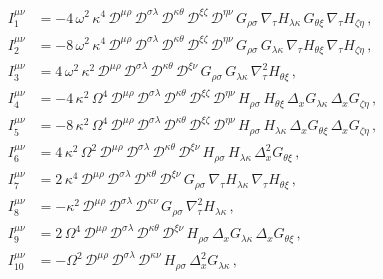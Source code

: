 \documentclass[11pt]{article}
\newcommand{\CD}{\mathcal{D}}
\begin{document}
\begin{subequations}
\begin{align}
	I_1^{\mu\nu} & = - 4 \, \omega^2 \, \kappa^4 \, \CD^{\mu\rho} \, \CD^{\sigma\lambda} \, \CD^{\kappa\theta} \, \CD^{\xi\zeta}  \, \CD^{\eta\nu} \, G_{\rho\sigma} \, \nabla_{\!\tau} H_{\lambda\kappa} \, G_{\theta\xi} \, \nabla_{\!\tau} H_{\zeta\eta}\,, \\[2pt]
	I_2^{\mu\nu} & = - 8 \, \omega^2 \, \kappa^4 \, \CD^{\mu\rho} \, \CD^{\sigma\lambda} \, \CD^{\kappa\theta} \, \CD^{\xi\zeta}  \, \CD^{\eta\nu} \, G_{\rho\sigma} \, G_{\lambda\kappa} \, \nabla_{\!\tau} H_{\theta\xi} \, \nabla_{\!\tau} H_{\zeta\eta}\,, \\[2pt]
	I_3^{\mu\nu} & = 4 \, \omega^2 \, \kappa^2 \, \CD^{\mu\rho} \, \CD^{\sigma\lambda} \, \CD^{\kappa\theta} \, \CD^{\xi\nu} \, G_{\rho\sigma} \, G_{\lambda\kappa} \,  \nabla^2_{\!\tau} H_{\theta\xi}\,, \\[2pt]
	I_4^{\mu\nu} & = - 4 \, \kappa^2 \, \Omega^4 \, \CD^{\mu\rho} \, \CD^{\sigma\lambda} \, \CD^{\kappa\theta} \, \CD^{\xi\zeta}  \, \CD^{\eta\nu} \, H_{\rho\sigma} \, H_{\theta\xi} \, \Delta_x G_{\lambda\kappa} \, \Delta_x G_{\zeta\eta}\,, \\[2pt]
	I_5^{\mu\nu} & = - 8 \, \kappa^2 \, \Omega^4 \, \CD^{\mu\rho} \, \CD^{\sigma\lambda} \, \CD^{\kappa\theta} \, \CD^{\xi\zeta}  \, \CD^{\eta\nu} \, H_{\rho\sigma} \, H_{\lambda\kappa} \, \Delta_x G_{\theta\xi} \, \Delta_x G_{\zeta\eta}\,, \\[2pt]
	I_6^{\mu\nu} & = 4 \, \kappa^2 \, \Omega^2 \, \CD^{\mu\rho} \, \CD^{\sigma\lambda} \, \CD^{\kappa\theta} \, \CD^{\xi\nu} \, H_{\rho\sigma} \, H_{\lambda\kappa} \,  \Delta^2_{x} G_{\theta\xi}\,, \\[2pt]
	I_7^{\mu\nu} & = 2 \, \kappa^4 \, \CD^{\mu\rho} \, \CD^{\sigma\lambda} \, \CD^{\kappa\theta} \, \CD^{\xi\nu} \, G_{\rho\sigma} \, \nabla_{\!\tau} H_{\lambda\kappa} \,  \nabla_{\!\tau} H_{\theta\xi}\,, \\[2pt]
	I_8^{\mu\nu} & = - \kappa^2 \, \CD^{\mu\rho} \, \CD^{\sigma\lambda} \, \CD^{\kappa\nu} \, G_{\rho\sigma} \, \nabla^2_{\!\tau} H_{\lambda\kappa}\,, \\[2pt]
	I_9^{\mu\nu} & = 2 \, \Omega^4 \, \CD^{\mu\rho} \, \CD^{\sigma\lambda} \, \CD^{\kappa\theta} \, \CD^{\xi\nu} \, H_{\rho\sigma} \, \Delta_{x} G_{\lambda\kappa} \, \Delta_{x} G_{\theta\xi}\,, \\[2pt]
	I_{10}^{\mu\nu} & = - \Omega^2 \, \CD^{\mu\rho} \, \CD^{\sigma\lambda} \, \CD^{\kappa\nu} \, H_{\rho\sigma} \, \Delta^2_{x} G_{\lambda\kappa}\,,
\end{align}
\end{subequations}
\end{document}
